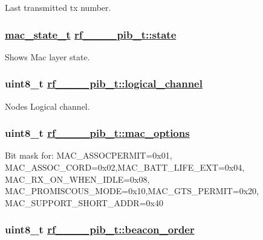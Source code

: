 Last transmitted tx number. \hypertarget{structrf__802__15__4__pib__t_5919614e012e3cd8e90963e484f0a5c7}{
\subsubsection[state]{\setlength{\rightskip}{0pt plus 5cm}\hyperlink{rf__802__15__4_8h_222287b6ac933745e39ca393bb0cfe4f}{mac\_\-state\_\-t} \hyperlink{structrf__802__15__4__pib__t_5919614e012e3cd8e90963e484f0a5c7}{rf\_\_\_\_\-pib\_\-t::state}}}
\label{structrf__802__15__4__pib__t_5919614e012e3cd8e90963e484f0a5c7}


Shows Mac layer state. \hypertarget{structrf__802__15__4__pib__t_dddfdd709fd10c0f6905935cf79e70cd}{
\subsubsection[logical\_\-channel]{\setlength{\rightskip}{0pt plus 5cm}uint8\_\-t \hyperlink{structrf__802__15__4__pib__t_dddfdd709fd10c0f6905935cf79e70cd}{rf\_\_\_\_\-pib\_\-t::logical\_\-channel}}}
\label{structrf__802__15__4__pib__t_dddfdd709fd10c0f6905935cf79e70cd}


Nodes Logical channel. \hypertarget{structrf__802__15__4__pib__t_ea80646f1870b4a766d8859c8d335d3f}{
\subsubsection[mac\_\-options]{\setlength{\rightskip}{0pt plus 5cm}uint8\_\-t \hyperlink{structrf__802__15__4__pib__t_ea80646f1870b4a766d8859c8d335d3f}{rf\_\_\_\_\-pib\_\-t::mac\_\-options}}}
\label{structrf__802__15__4__pib__t_ea80646f1870b4a766d8859c8d335d3f}


Bit mask for: MAC\_\-ASSOCPERMIT=0x01, MAC\_\-ASSOC\_\-CORD=0x02,MAC\_\-BATT\_\-LIFE\_\-EXT=0x04, MAC\_\-RX\_\-ON\_\-WHEN\_\-IDLE=0x08, MAC\_\-PROMISCOUS\_\-MODE=0x10,MAC\_\-GTS\_\-PERMIT=0x20, MAC\_\-SUPPORT\_\-SHORT\_\-ADDR=0x40 \hypertarget{structrf__802__15__4__pib__t_9a5cae51885b5106357388a53dff4fd0}{
\subsubsection[beacon\_\-order]{\setlength{\rightskip}{0pt plus 5cm}uint8\_\-t \hyperlink{structrf__802__15__4__pib__t_9a5cae51885b5106357388a53dff4fd0}{rf\_\_\_\_\-pib\_\-t::beacon\_\-order}}}
\label{structrf__802__15__4__pib__t_9a5cae51885b5106357388a53dff4fd0}


